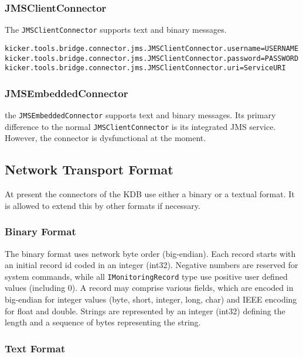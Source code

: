 \documentclass[11pt,a4paper]{article}
\begin{document}
%
\subsubsection{JMSClientConnector}

The \texttt{JMSClientConnector} supports text and binary messages.

\begin{verbatim}
kicker.tools.bridge.connector.jms.JMSClientConnector.username=USERNAME
kicker.tools.bridge.connector.jms.JMSClientConnector.password=PASSWORD
kicker.tools.bridge.connector.jms.JMSClientConnector.uri=ServiceURI
\end{verbatim}

%
\subsubsection{JMSEmbeddedConnector}

the \texttt{JMSEmbeddedConnector} supports text and binary messages. Its primary difference to the normal \texttt{JMSClientConnector} is its integrated JMS service. However, the connector is dysfunctional at the moment.

%
\subsection{Network Transport Format}

At present the connectors of the KDB use either a binary or a textual format. It is allowed to extend this by other formats if necessary.

%
\subsubsection{Binary Format}

The binary format uses network byte order (big-endian). Each record starts with an initial record id coded in an integer (int32). Negative numbers are reserved for system commands, while all \texttt{IMonitoringRecord} type use positive user defined values (including 0). A record may comprise various fields, which are encoded in big-endian for integer values (byte, short, integer, long, char) and IEEE encoding for float and double. Strings are represented by an integer (int32) defining the length and a sequence of bytes representing the string.

%
\subsubsection{Text Format}
\end{document}
